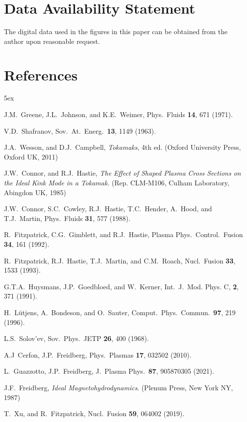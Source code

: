 \documentclass[12pt,prb,aps]{revtex4-1}
\begin{document}
\section*{Data Availability Statement}
The digital data used in the figures in this paper can be obtained from the author upon reasonable request.

\section*{References}
\begin{thebibliography}{99}\baselineskip 5ex

 J.M.~Greene, J.L.~Johnson, and K.E.~Weimer,  Phys.\  Fluids  {\bf 14}, 671 (1971).

 V.D.~Shafranov, Sov.\ At.\ Energ.\ {\bf 13}, 1149 (1963).

 J.A.~Wesson, and D.J.~Campbell, {\em Tokamaks}, 4th ed. (Oxford University Press, Oxford UK, 2011)

 J.W.~Connor, and R.J.~Hastie, {\em The Effect of Shaped Plasma Cross Sections on the Ideal Kink Mode in a Tokamak}. (Rep. CLM-M106, Culham Laboratory, Abingdon UK, 1985)

  J.W.~Connor, S.C.~Cowley, R.J.~Hastie, T.C.~Hender, A.~Hood, and T.J.~Martin, Phys.\ Fluids {\bf 31}, 577 (1988).

 R.~Fitzpatrick, C.G.~Gimblett, and R.J.~Hastie, Plasma Phys.\ Control.\ Fusion {\bf 34}, 161 (1992). 

 R.~Fitzpatrick, R.J.~Hastie, T.J.~Martin, and C.M.~Roach,  Nucl.\ Fusion {\bf 33}, 1533 (1993).

 G.T.A.~Huysmans, J.P.~Goedbloed, and W.~Kerner, Int.\ J.\ Mod. Phys. C,  {\bf 2}, 371 (1991).

 H.~L\"{u}tjens, A.~Bondeson, and O.~Sauter, Comput.\ Phys.\ Commun.\ {\bf 97}, 219 (1996).

 L.S.~Solov'ev, Sov.\ Phys.\ JETP {\bf 26}, 400 (1968).

 A.J~Cerfon, J.P.~Freidberg, Phys.\  Plasmas  {\bf 17},  032502 (2010).

 L.~Guazzotto, J.P.~Freidberg, J.\  Plasma Phys.\ {\bf 87},  905870305 (2021).

 J.F.~Freidberg, {\em Ideal Magnetohydrodynamics}. (Plenum Press, New York NY, 1987)

 T.~Xu, and R.~Fitzpatrick, Nucl.\ Fusion {\bf 59},  064002 (2019).


\end{thebibliography}
\end{document}
